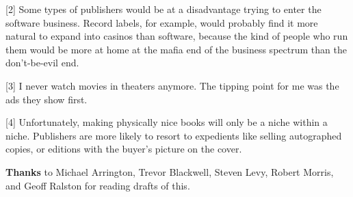 [2] Some types of publishers would be at a disadvantage trying
                  to enter the software business. Record labels, for example,
                  would probably find it more natural to expand into casinos
                  than software, because the kind of people who run them would
                  be more at home at the mafia end of the business spectrum than
                  the don't-be-evil end.

[3] I never watch movies in theaters anymore. The tipping point
                  for me was the ads they show first.

[4] Unfortunately, making physically nice books will only be a
                  niche within a niche. Publishers are more likely to resort to
                  expedients like selling autographed copies, or editions with
                  the buyer's picture on the cover.

\textbf{Thanks} to
                  Michael Arrington, Trevor Blackwell, Steven Levy, Robert
                  Morris, and Geoff Ralston for reading drafts of this.


              
            
          
            
              
                


                  
              
            
          
